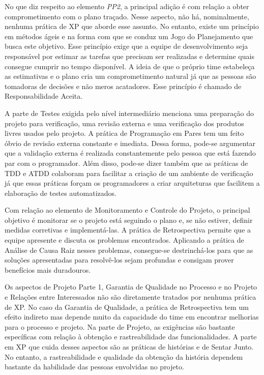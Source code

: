 No que diz respeito ao elemento \textit{PP2}, a principal adição é com
relação a obter comprometimento com o plano traçado. Nesse aspecto,
não há, nominalmente, nenhuma prática de XP que aborde esse
assunto. No entanto, existe um princípio em métodos ágeis e na forma
com que se conduz um Jogo do Planejamento que busca este
objetivo. Esse princípio exige que a equipe de desenvolvimento seja
responsável por estimar as tarefas que precisam ser realizadas e
determine quais consegue cumprir no tempo disponível. A ideia de que o
próprio time estabeleça as estimativas e o plano cria um
comprometimento natural já que as pessoas são tomadoras de decisões e
não meros acatadores. Esse princípio é chamado de Responsabilidade
Aceita.

A parte de Testes exigida pelo nível intermediário menciona uma
preparação do projeto para verificação, uma revisão externa e uma
verificação dos produtos livres usados pelo projeto. A prática de
Programação em Pares tem um feito óbvio de revisão externa constante e
imediata. Dessa forma, pode-se argumentar que a validação externa é
realizada constantemente pelo pessoa que está fazendo par com o
programador. Além disso, pode-se dizer também que as práticas de TDD e
ATDD colaboram para facilitar a criação de um ambiente de verificação
já que essas práticas forçam os programadores a criar arquiteturas que
facilitem a elaboração de testes automatizados.

Com relação ao elemento de Monitoramento e Controle do Projeto, o
principal objetivo é monitorar se o projeto está seguindo o plano e,
se não estiver, definir medidas corretivas e implementá-las. A prática
de Retrospectiva permite que a equipe apresente e discuta os problemas
encontrados. Aplicando a prática de Análise de Causa Raiz nesses
problemas, consegue-se destrinchá-los para que as soluções
apresentadas para resolvê-los sejam profundas e consigam prover
benefícios mais duradouros.

Os aspectos de Projeto Parte 1, Garantia de Qualidade no Processo e no
Projeto e Relações entre Interessados não são diretamente tratados por
nenhuma prática de XP. No caso da Garantia de Qualidade, a prática de
Retrospectiva tem um efeito indireto mas depende muito da capacidade
do time em encontrar melhorias para o processo e projeto. Na parte de
Projeto, as exigências são bastante específicas com relação à obtenção
e rastreabilidade das funcionalidades. A parte em XP que cuida desses
aspectos são as práticas de histórias e de Sentar Junto. No entanto, a
rastreabilidade e qualidade da obtenção da história dependem bastante
da habilidade das pessoas envolvidas no projeto.

